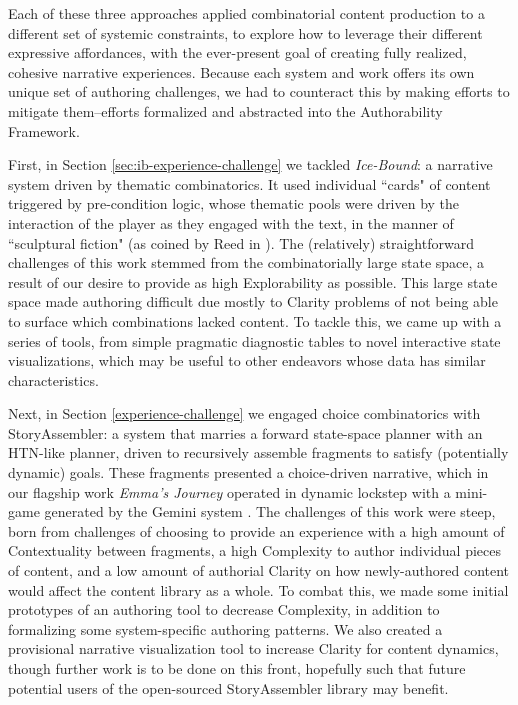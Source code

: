 Each of these three approaches applied combinatorial content production to a different set of systemic constraints, to explore how to leverage their different expressive affordances, with the ever-present goal of creating fully realized, cohesive narrative experiences. Because each system and work offers its own unique set of authoring challenges, we had to counteract this by making efforts to mitigate them--efforts formalized and abstracted into the Authorability Framework.

First, in Section \ref{sec:ib-experience-challenge} we tackled \textit{Ice-Bound}: a narrative system driven by thematic combinatorics. It used individual ``cards" of content triggered by pre-condition logic, whose thematic pools were driven by the interaction of the player as they engaged with the text, in the manner of ``sculptural fiction" (as coined by Reed in \cite{reed_changeful}). The (relatively) straightforward challenges of this work stemmed from the combinatorially large state space, a result of our desire to provide as high Explorability as possible. This large state space made authoring difficult due mostly to Clarity problems of not being able to surface which combinations lacked content. To tackle this, we came up with a series of tools, from simple pragmatic diagnostic tables to novel interactive state visualizations, which may be useful to other endeavors whose data has similar characteristics.

Next, in Section \ref{experience-challenge} we engaged choice combinatorics with StoryAssembler: a system that marries a forward state-space planner with an HTN-like planner, driven to recursively assemble fragments to satisfy (potentially dynamic) goals. These fragments presented a choice-driven narrative, which in our flagship work \textit{Emma's Journey} operated in dynamic lockstep with a mini-game generated by the Gemini system \cite{Gemini}. The challenges of this work were steep, born from challenges of choosing to provide an experience with a high amount of Contextuality between fragments, a high Complexity to author individual pieces of content, and a low amount of authorial Clarity on how newly-authored content would affect the content library as a whole. To combat this, we made some initial prototypes of an authoring tool to decrease Complexity, in addition to formalizing some system-specific authoring patterns. We also created a provisional narrative visualization tool to increase Clarity for content dynamics, though further work is to be done on this front, hopefully such that future potential users of the open-sourced StoryAssembler library may benefit.

